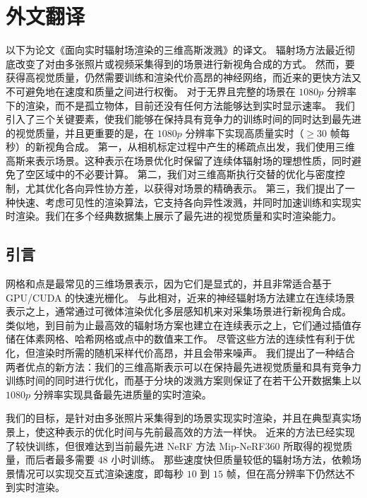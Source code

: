 \cleardoublepage

\newrefsection

\chapter{外文翻译}


以下为论文《面向实时辐射场渲染的三维高斯泼溅》的译文\cite{kerbl2023}。
辐射场方法最近彻底改变了对由多张照片或视频采集得到的场景进行新视角合成的方式。
然而，要获得高视觉质量，仍然需要训练和渲染代价高昂的神经网络，而近来的更快方法又不可避免地在速度和质量之间进行权衡。
对于无界且完整的场景在 \(1080p\) 分辨率下的渲染，而不是孤立物体，目前还没有任何方法能够达到实时显示速率。
我们引入了三个关键要素，使我们能够在保持具有竞争力的训练时间的同时达到最先进的视觉质量，并且更重要的是，在 \(1080p\) 分辨率下实现高质量实时（\(\ge 30\) 帧每秒）的新视角合成。
第一，从相机标定过程中产生的稀疏点出发，我们使用三维高斯来表示场景。这种表示在场景优化时保留了连续体辐射场的理想性质，同时避免了空区域中的不必要计算。
第二，我们对三维高斯执行交替的优化与密度控制，尤其优化各向异性协方差，以获得对场景的精确表示。
第三，我们提出了一种快速、考虑可见性的渲染算法，它支持各向异性泼溅，并同时加速训练和实现实时渲染。我们在多个经典数据集上展示了最先进的视觉质量和实时渲染能力。

\section{引言}

网格和点是最常见的三维场景表示，因为它们是显式的，并且非常适合基于 GPU/CUDA 的快速光栅化。
与此相对，近来的神经辐射场方法建立在连续场景表示之上，通常通过可微体渲染优化多层感知机来对采集场景进行新视角合成。
类似地，到目前为止最高效的辐射场方案也建立在连续表示之上，它们通过插值存储在体素网格、哈希网格或点中的数值来工作。
尽管这些方法的连续性有利于优化，但渲染时所需的随机采样代价高昂，并且会带来噪声。
我们提出了一种结合两者优点的新方法：我们的三维高斯表示可以在保持最先进视觉质量和具有竞争力训练时间的同时进行优化，而基于分块的泼溅方案则保证了在若干公开数据集上以 \(1080p\) 分辨率实现具备最先进质量的实时渲染。

我们的目标，是针对由多张照片采集得到的场景实现实时渲染，并且在典型真实场景上，使这种表示的优化时间与先前最高效的方法一样快。
近来的方法已经实现了较快训练，但很难达到当前最先进 NeRF 方法 Mip-NeRF360 所取得的视觉质量，而后者最多需要 \(48\) 小时训练。
那些速度快但质量较低的辐射场方法，依赖场景情况可以实现交互式渲染速度，即每秒 \(10\) 到 \(15\) 帧，但在高分辨率下仍然达不到实时渲染。

